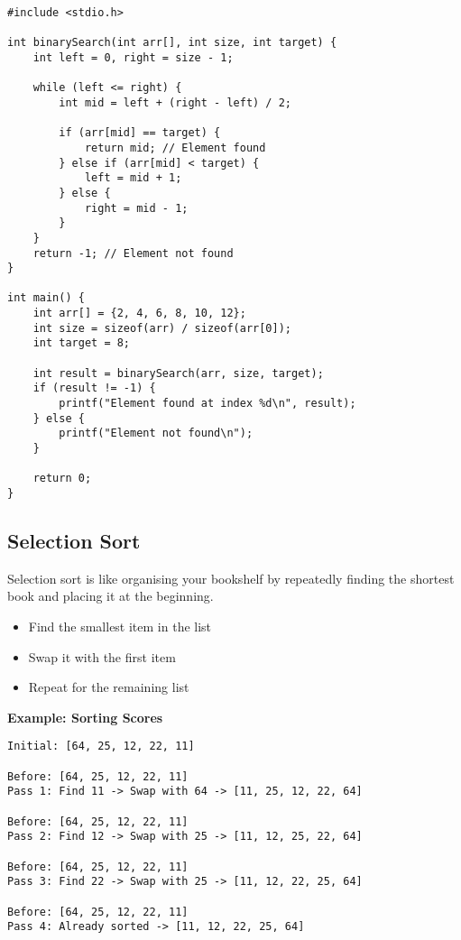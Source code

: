 \documentclass[a4paper,12pt]{article}
\begin{document}
\lstset{language=C}
\begin{lstlisting}
#include <stdio.h>

int binarySearch(int arr[], int size, int target) {
    int left = 0, right = size - 1;

    while (left <= right) {
        int mid = left + (right - left) / 2;

        if (arr[mid] == target) {
            return mid; // Element found
        } else if (arr[mid] < target) {
            left = mid + 1;
        } else {
            right = mid - 1;
        }
    }
    return -1; // Element not found
}

int main() {
    int arr[] = {2, 4, 6, 8, 10, 12};
    int size = sizeof(arr) / sizeof(arr[0]);
    int target = 8;

    int result = binarySearch(arr, size, target);
    if (result != -1) {
        printf("Element found at index %d\n", result);
    } else {
        printf("Element not found\n");
    }

    return 0;
}
\end{lstlisting}

\hrulefill

\newpage

\subsection{Selection Sort}

Selection sort is like organising your bookshelf by repeatedly finding the shortest book and placing it at the beginning.

\begin{itemize}
    \item Find the smallest item in the list
    \item Swap it with the first item
    \item Repeat for the remaining list
\end{itemize}

\textbf{Example: Sorting Scores}
\begin{verbatim}
Initial: [64, 25, 12, 22, 11]

Before: [64, 25, 12, 22, 11]
Pass 1: Find 11 -> Swap with 64 -> [11, 25, 12, 22, 64]

Before: [64, 25, 12, 22, 11]
Pass 2: Find 12 -> Swap with 25 -> [11, 12, 25, 22, 64]

Before: [64, 25, 12, 22, 11]
Pass 3: Find 22 -> Swap with 25 -> [11, 12, 22, 25, 64]

Before: [64, 25, 12, 22, 11]
Pass 4: Already sorted -> [11, 12, 22, 25, 64]
\end{verbatim}
\end{document}
